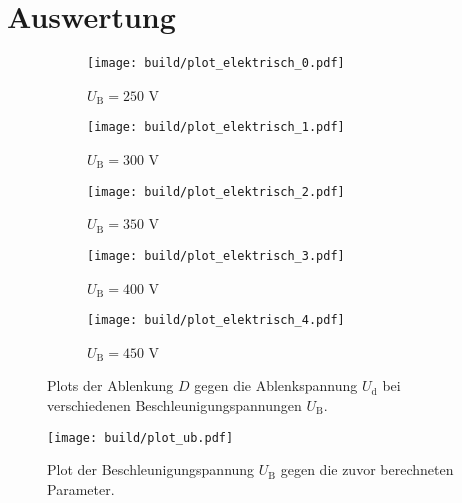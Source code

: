 \section{Auswertung}
\label{sec:Auswertung}


\begin{figure}
  \centering
  \begin{subfigure}{0.49\textwidth}
    \centering
    \texttt{[image: build/plot\_elektrisch\_0.pdf]}
    \caption{$U_\text{B} = 250$ V}
  \end{subfigure}
  \begin{subfigure}{0.49\textwidth}
    \centering
    \texttt{[image: build/plot\_elektrisch\_1.pdf]}
    \caption{$U_\text{B} = 300$ V}
  \end{subfigure}

  \begin{subfigure}{0.49\textwidth}
    \centering
    \texttt{[image: build/plot\_elektrisch\_2.pdf]}
    \caption{$U_\text{B} = 350$ V}
  \end{subfigure}
  \begin{subfigure}{0.49\textwidth}
    \centering
    \texttt{[image: build/plot\_elektrisch\_3.pdf]}
    \caption{$U_\text{B} = 400$ V}
  \end{subfigure}

  \begin{subfigure}{0.49\textwidth}
    \centering
    \texttt{[image: build/plot\_elektrisch\_4.pdf]}
    \caption{$U_\text{B} = 450$ V}
  \end{subfigure}
  \caption{Plots der Ablenkung $D$ gegen die Ablenkspannung $U_\text{d}$ bei verschiedenen Beschleunigungspannungen $U_\text{B}$.}
  \label{fig:plot-elektrisch}
\end{figure}

\begin{figure}
  \centering
  \texttt{[image: build/plot\_ub.pdf]}
  \caption{Plot der Beschleunigungspannung $U_\text{B}$ gegen die zuvor berechneten Parameter.}
  \label{fig:plt-ub}
\end{figure}